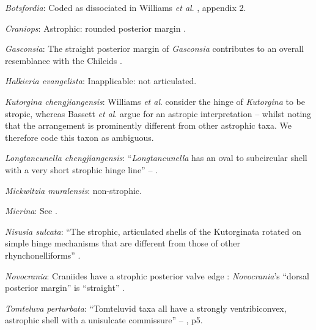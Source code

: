 \documentclass[openany]{book}
\theoremstyle{definition}
\theoremstyle{definition}
\theoremstyle{definition}
\theoremstyle{remark}
\begin{document}
\hypertarget{Botsfordia-coding-6}{}
\emph{Botsfordia}: Coded as dissociated in Williams \emph{et al}.
\citeyearpar{Williams1998Thediversity}, appendix 2.

\hypertarget{Craniops-coding-6}{}
\emph{Craniops}: Astrophic: rounded posterior margin \citep[see fig. 91
in][]{Williams2000LinguliformeaCraniiformea}.

\hypertarget{Gasconsia-coding-6}{}
\emph{Gasconsia}: The straight posterior margin of \emph{Gasconsia}
contributes to an overall resemblance with the Chileids
\citep{Holmer2014Ordovician96}.

\hypertarget{Halkieria_evangelista-coding-6}{}
\emph{Halkieria evangelista}: Inapplicable: not articulated.

\hypertarget{Kutorgina_chengjiangensis-coding-6}{}
\emph{Kutorgina chengjiangensis}: Williams \emph{et al}.
\citeyearpar[p.~208]{Williams2000LinguliformeaCraniiformea} consider the
hinge of \emph{Kutorgina} to be stropic, whereas Bassett \emph{et al}.
\citeyearpar{Bassett2001Functionalmorphology} argue for an astropic
interpretation -- whilst noting that the arrangement is prominently
different from other astrophic taxa. We therefore code this taxon as
ambiguous.

\hypertarget{Longtancunella_chengjiangensis-coding-6}{}
\emph{Longtancunella chengjiangensis}: ``\emph{Longtancunella} has an
oval to subcircular shell with a very short strophic hinge line'' --
\citet{Zhang2011Theexceptionally}.

\hypertarget{Mickwitzia_muralensis-coding-6}{}
\emph{Mickwitzia muralensis}: non-strophic.

\hypertarget{Micrina-coding-6}{}
\emph{Micrina}: See \citet{Holmer2008TheEarly}.

\hypertarget{Nisusia_sulcata-coding-6}{}
\emph{Nisusia sulcata}: ``The strophic, articulated shells of the
Kutorginata rotated on simple hinge mechanisms that are different from
those of other rhynchonelliforms''
\citep[p.~208]{Williams2000LinguliformeaCraniiformea}.

\hypertarget{Novocrania-coding-6}{}
\emph{Novocrania}: Craniides have a strophic posterior valve edge
\citep[table 39 on p.~2853]{Williams2007Supplement}: \emph{Novocrania}'s
``dorsal posterior margin'' is ``straight''
\citep[p.~171]{Williams2000LinguliformeaCraniiformea}.

\hypertarget{Tomteluva_perturbata-coding-6}{}
\emph{Tomteluva perturbata}: ``Tomteluvid taxa all have a strongly
ventribiconvex, astrophic shell with a unisulcate commissure'' --
\citet{Streng2016Anew}, p5.
\end{document}
